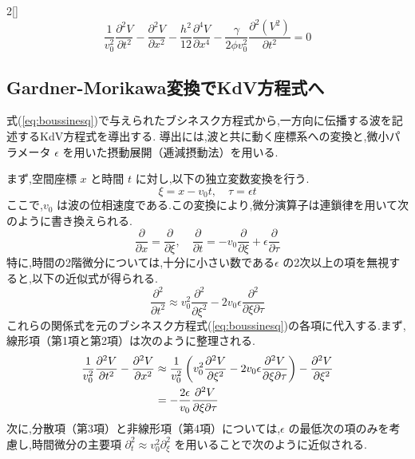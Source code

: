 \documentclass[a4paper,10pt]{article}
\begin{document}
\begin{multicols}{2}[\raggedcolumns]
\begin{equation}
    \frac{1}{v_0^2}\frac{\partial^2 V}{\partial t^2} - \frac{\partial^2 V}{\partial x^2} - \frac{h^2}{12}\frac{\partial^4 V}{\partial x^4} - \frac{\gamma}{2\phi v_0^2}\frac{\partial^2 (V^2)}{\partial t^2} = 0 \label{eq:boussinesq}
\end{equation}

\subsection{Gardner-Morikawa変換でKdV方程式へ}
式(\ref{eq:boussinesq})で与えられたブシネスク方程式から,一方向に伝播する波を記述するKdV方程式を導出する.
導出には,波と共に動く座標系への変換と,微小パラメータ $\epsilon$ を用いた摂動展開（逓減摂動法）を用いる.

まず,空間座標 $x$ と時間 $t$ に対し,以下の独立変数変換を行う.
\begin{equation}
    \xi = x - v_0 t, \quad \tau = \epsilon t
\end{equation}
ここで,$v_0$ は波の位相速度である.この変換により,微分演算子は連鎖律を用いて次のように書き換えられる.
\begin{equation}
    \frac{\partial}{\partial x} = \frac{\partial}{\partial \xi}, \quad
    \frac{\partial}{\partial t} = -v_0 \frac{\partial}{\partial \xi} + \epsilon \frac{\partial}{\partial \tau}
\end{equation}
特に,時間の2階微分については,十分に小さい数である$\epsilon$ の2次以上の項を無視すると,以下の近似式が得られる.
\begin{equation}
    \frac{\partial^2}{\partial t^2} \approx v_0^2 \frac{\partial^2}{\partial \xi^2} - 2v_0 \epsilon \frac{\partial^2}{\partial \xi \partial \tau}
\end{equation}
これらの関係式を元のブシネスク方程式(\ref{eq:boussinesq})の各項に代入する.まず,線形項（第1項と第2項）は次のように整理される.
\begin{align}
    \frac{1}{v_0^2}\frac{\partial^2 V}{\partial t^2} - \frac{\partial^2 V}{\partial x^2} 
    &\approx \frac{1}{v_0^2} \left( v_0^2 \frac{\partial^2 V}{\partial \xi^2} - 2v_0 \epsilon \frac{\partial^2 V}{\partial \xi \partial \tau} \right) - \frac{\partial^2 V}{\partial \xi^2} \notag \\
    &= -\frac{2\epsilon}{v_0} \frac{\partial^2 V}{\partial \xi \partial \tau}
\end{align}
次に,分散項（第3項）と非線形項（第4項）については,$\epsilon$ の最低次の項のみを考慮し,時間微分の主要項 $\partial_t^2 \approx v_0^2 \partial_\xi^2$ を用いることで次のように近似される.

\end{multicols}
\end{document}
